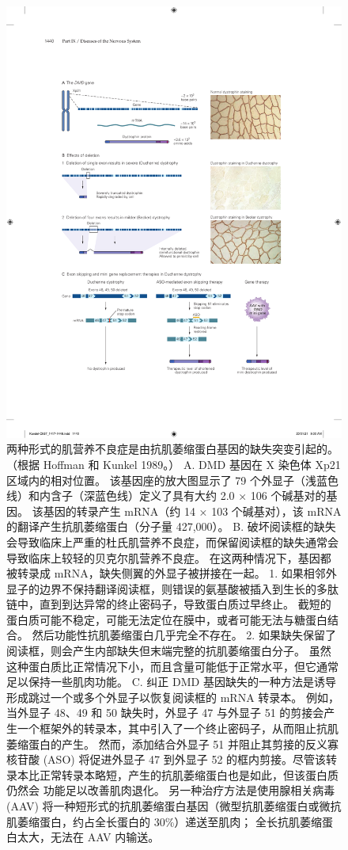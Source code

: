 \begin{figure}[htbp]
	\centering
	\includegraphics[width=0.9\linewidth]{chap57/fig_57_10}
	\caption{两种形式的肌营养不良症是由抗肌萎缩蛋白基因的缺失突变引起的。 （根据 Hoffman 和 Kunkel 1989。） A. DMD 基因在 X 染色体 Xp21 区域内的相对位置。 该基因座的放大图显示了 79 个外显子（浅蓝色线）和内含子（深蓝色线）定义了具有大约 2.0 × 106 个碱基对的基因。 该基因的转录产生 mRNA（约 14 × 103 个碱基对），该 mRNA 的翻译产生抗肌萎缩蛋白（分子量 427,000）。 B. 破坏阅读框的缺失会导致临床上严重的杜氏肌营养不良症，而保留阅读框的缺失通常会导致临床上较轻的贝克尔肌营养不良症。 在这两种情况下，基因都被转录成 mRNA，缺失侧翼的外显子被拼接在一起。 1. 如果相邻外显子的边界不保持翻译阅读框，则错误的氨基酸被插入到生长的多肽链中，直到到达异常的终止密码子，导致蛋白质过早终止。 截短的蛋白质可能不稳定，可能无法定位在膜中，或者可能无法与糖蛋白结合。 然后功能性抗肌萎缩蛋白几乎完全不存在。 2. 如果缺失保留了阅读框，则会产生内部缺失但末端完整的抗肌萎缩蛋白分子。 虽然这种蛋白质比正常情况下小，而且含量可能低于正常水平，但它通常足以保持一些肌肉功能。 C. 纠正 DMD 基因缺失的一种方法是诱导形成跳过一个或多个外显子以恢复阅读框的 mRNA 转录本。 例如，当外显子 48、49 和 50 缺失时，外显子 47 与外显子 51 的剪接会产生一个框架外的转录本，其中引入了一个终止密码子，从而阻止抗肌萎缩蛋白的产生。 然而，添加结合外显子 51 并阻止其剪接的反义寡核苷酸 (ASO) 将促进外显子 47 到外显子 52 的框内剪接。尽管该转录本比正常转录本略短，产生的抗肌萎缩蛋白也是如此，但该蛋白质仍然会 功能足以改善肌肉退化。 另一种治疗方法是使用腺相关病毒 (AAV) 将一种短形式的抗肌萎缩蛋白基因（微型抗肌萎缩蛋白或微抗肌萎缩蛋白，约占全长蛋白的 30\%）递送至肌肉； 全长抗肌萎缩蛋白太大，无法在 AAV 内输送。}
	\label{fig:57_10}
\end{figure}



